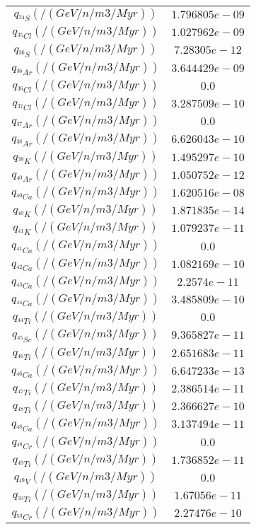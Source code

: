 \begin{tabular}{c |c}
	$q_{^{34}S} (/(GeV/n/m3/Myr))$ & $1.796805e-09$ \\ 
	$q_{^{35}Cl} (/(GeV/n/m3/Myr))$ & $1.027962e-09$ \\ 
	$q_{^{36}S} (/(GeV/n/m3/Myr))$ & $7.28305e-12$ \\ 
	$q_{^{36}Ar} (/(GeV/n/m3/Myr))$ & $3.644429e-09$ \\ 
	$q_{^{36}Cl} (/(GeV/n/m3/Myr))$ & $0.0$ \\ 
	$q_{^{37}Cl} (/(GeV/n/m3/Myr))$ & $3.287509e-10$ \\ 
	$q_{^{37}Ar} (/(GeV/n/m3/Myr))$ & $0.0$ \\ 
	$q_{^{38}Ar} (/(GeV/n/m3/Myr))$ & $6.626043e-10$ \\ 
	$q_{^{39}K} (/(GeV/n/m3/Myr))$ & $1.495297e-10$ \\ 
	$q_{^{40}Ar} (/(GeV/n/m3/Myr))$ & $1.050752e-12$ \\ 
	$q_{^{40}Ca} (/(GeV/n/m3/Myr))$ & $1.620516e-08$ \\ 
	$q_{^{40}K} (/(GeV/n/m3/Myr))$ & $1.871835e-14$ \\ 
	$q_{^{41}K} (/(GeV/n/m3/Myr))$ & $1.079237e-11$ \\ 
	$q_{^{41}Ca} (/(GeV/n/m3/Myr))$ & $0.0$ \\ 
	$q_{^{42}Ca} (/(GeV/n/m3/Myr))$ & $1.082169e-10$ \\ 
	$q_{^{43}Ca} (/(GeV/n/m3/Myr))$ & $2.2574e-11$ \\ 
	$q_{^{44}Ca} (/(GeV/n/m3/Myr))$ & $3.485809e-10$ \\ 
	$q_{^{44}Ti} (/(GeV/n/m3/Myr))$ & $0.0$ \\ 
	$q_{^{45}Sc} (/(GeV/n/m3/Myr))$ & $9.365827e-11$ \\ 
	$q_{^{46}Ti} (/(GeV/n/m3/Myr))$ & $2.651683e-11$ \\ 
	$q_{^{46}Ca} (/(GeV/n/m3/Myr))$ & $6.647233e-13$ \\ 
	$q_{^{47}Ti} (/(GeV/n/m3/Myr))$ & $2.386514e-11$ \\ 
	$q_{^{48}Ti} (/(GeV/n/m3/Myr))$ & $2.366627e-10$ \\ 
	$q_{^{48}Ca} (/(GeV/n/m3/Myr))$ & $3.137494e-11$ \\ 
	$q_{^{48}Cr} (/(GeV/n/m3/Myr))$ & $0.0$ \\ 
	$q_{^{49}Ti} (/(GeV/n/m3/Myr))$ & $1.736852e-11$ \\ 
	$q_{^{49}V} (/(GeV/n/m3/Myr))$ & $0.0$ \\ 
	$q_{^{50}Ti} (/(GeV/n/m3/Myr))$ & $1.67056e-11$ \\ 
	$q_{^{50}Cr} (/(GeV/n/m3/Myr))$ & $2.27476e-10$ \\ 

\end{tabular}
